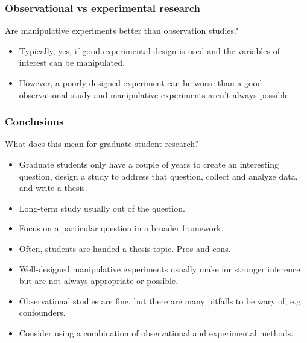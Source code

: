 \documentclass[color=usenames,dvipsnames]{beamer}\usepackage[]{graphicx}\usepackage[]{color}
\begin{document}
\begin{frame}
  \frametitle{Observational vs experimental research}
  Are manipulative experiments better than observation studies? \\
  \begin{itemize}
    \item Typically, yes, if good experimental design is used and the
      variables of interest can be manipulated.
    \item However, a poorly designed experiment can be worse than a good
      observational study and manipulative experiments aren't always
      possible. 
  \end{itemize}
\end{frame}


\begin{frame}
  \frametitle{Conclusions}
  What does this mean for graduate student research?
  \begin{itemize}[<+->]
    \item Graduate students only have a couple of years to create an
      interesting question, design a study to address that question,
      collect and analyze data, and write a thesis.
    \item Long-term study usually out of the question.
    \item Focus on a particular question in a broader framework.
    \item Often, students are handed a thesis topic. Pros and cons.
    \item Well-designed manipulative experiments usually make for
      stronger inference but are not always appropriate or possible. 
    \item Observational studies are fine, but there are many pitfalls
      to be wary of, e.g. confounders.
    \item Consider using a combination of observational and
      experimental methods.
  \end{itemize}
\end{frame}
\end{document}
